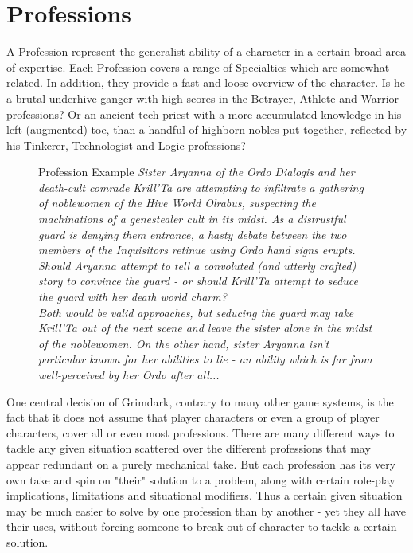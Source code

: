 \section{Professions} %
\label{sec:professions}
A Profession represent the generalist ability of a character in a certain broad area of expertise.
Each Profession covers a range of Specialties which are somewhat related.
In addition, they provide a fast and loose overview of the character.
Is he a brutal underhive ganger with high scores in the Betrayer, Athlete and Warrior professions?
Or an ancient tech priest with a more accumulated knowledge in his left (augmented) toe, than a handful of highborn nobles put together, reflected by his  Tinkerer, Technologist and Logic professions?
\begin{figure}[ht]
	\begin{DndSidebar}{Profession Example}
	\textit{Sister Aryanna of the Ordo Dialogis and her death-cult comrade Krill'Ta are attempting to infiltrate a gathering of noblewomen of the Hive World Olrabus, suspecting the machinations of a genestealer cult in its midst. As a distrustful guard is denying them entrance, a hasty debate between the two members of the Inquisitors retinue using Ordo hand signs erupts. Should Aryanna attempt to tell a convoluted (and utterly crafted) story to convince the guard - or should Krill'Ta attempt to seduce the guard with her death world charm?\\\noindent
	Both would be valid approaches, but seducing the guard may take Krill'Ta out of the next scene and leave the sister alone in the midst of the noblewomen. On the other hand, sister Aryanna isn't particular known for her abilities to lie - an ability which is far from well-perceived by her Ordo after all...\\}
	\end{DndSidebar}
\end{figure}

One central decision of Grimdark, contrary to many other game systems, is the fact that it does not assume that player characters or even a group of player characters, cover all or even most professions. 
There are many different ways to tackle any given situation scattered over the different professions that may appear redundant on a purely mechanical take.
But each profession has its very own take and spin on "their" solution to a problem, along with certain role-play implications, limitations and situational modifiers.
Thus a certain given situation may be much easier to solve by one profession than by another - yet they all have their uses, without forcing someone to break out of character to tackle a certain solution.

